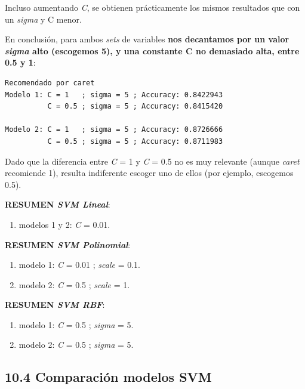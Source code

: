 \documentclass[
]{article}
\providecommand{\tightlist}{%
  \setlength{\itemsep}{0pt}\setlength{\parskip}{0pt}}
\begin{document}
Incluso aumentando \emph{C}, se obtienen prácticamente los mismos
resultados que con un \emph{sigma} y C menor.

En conclusión, para ambos \emph{sets} de variables \textbf{nos
decantamos por un valor \emph{sigma} alto (escogemos 5), y una constante
C no demasiado alta, entre 0.5 y 1}:

\begin{verbatim}
Recomendado por caret
Modelo 1: C = 1   ; sigma = 5 ; Accuracy: 0.8422943
          C = 0.5 ; sigma = 5 ; Accuracy: 0.8415420

Modelo 2: C = 1   ; sigma = 5 ; Accuracy: 0.8726666
          C = 0.5 ; sigma = 5 ; Accuracy: 0.8711983
\end{verbatim}

Dado que la diferencia entre \emph{C} = 1 y \emph{C} = 0.5 no es muy
relevante (aunque \emph{caret} recomiende 1), resulta indiferente
escoger uno de ellos (por ejemplo, escogemos 0.5).

\textbf{RESUMEN \emph{SVM Lineal}}:

\begin{enumerate}
\def\labelenumi{\arabic{enumi}.}
\tightlist
\item
  modelos 1 y 2: \emph{C} = 0.01.
\end{enumerate}

\textbf{RESUMEN \emph{SVM Polinomial}}:

\begin{enumerate}
\def\labelenumi{\arabic{enumi}.}
\tightlist
\item
  modelo 1: \emph{C} = 0.01 ; \emph{scale} = 0.1.
\item
  modelo 2: \emph{C} = 0.5 ; \emph{scale} = 1.
\end{enumerate}

\textbf{RESUMEN \emph{SVM RBF}}:

\begin{enumerate}
\def\labelenumi{\arabic{enumi}.}
\tightlist
\item
  modelo 1: \emph{C} = 0.5 ; \emph{sigma} = 5.
\item
  modelo 2: \emph{C} = 0.5 ; \emph{sigma} = 5.
\end{enumerate}

\hypertarget{comparaciuxf3n-modelos-svm}{%
\subsection{10.4 Comparación modelos
SVM}\label{comparaciuxf3n-modelos-svm}}
\end{document}
